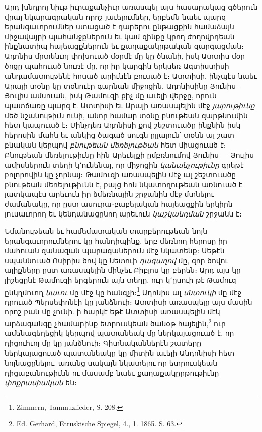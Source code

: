 \documentclass{article}
\begin{document}
{Արդ խնդրոյ նիւթ իւրաքանչիւր առասպել այս հասարակաց գծերուն վրայ նկարագրական որոշ յաւելումներ, երբեմն նաեւ պարզ երանգաւորումներ ստացած է դարերու ընթացքին համաձայն միջավայրի պահանջքներուն եւ կամ զինքը կրող ժողովրդեան ինքնատիպ հայեացքներուն եւ քաղաքակրթական զարգացման։ Ադոնիս մրտենւոյ փոխուած մօրմէ մը կը ծնանի, իսկ Ատտիս մօր ծոցը պահուած նուռէ մը, որ իր կարգին երկսեռ Ագտիստիսի անդամատութենէ հոսած արիւնէն բուսած է։ Ատտիսի, ինչպէս նաեւ Արայի տօնը կը տօնուէր գարնան միջոցին, Ադոնիսինը Յունիս — Յուլիս ամսուան, իսկ Թամուզի քիչ մը աւելի վերջը, որուն պատճառը պարզ է. Ատտիսի եւ Արայի առասպելին մէջ \emph{յարութիւնը} մեծ նշանութիւն ունի, անոր համար տօնը բնութեան զարթնումին հետ կապուած է։ Մինչդեռ Ադոնիսի քով շեշտուածը ինքնին իսկ հերոսին մահն եւ անկից ծագած սուգն ըլլալուն՝ տօնն ալ շատ բնական կերպով \emph{բնութեան մեռելութեան} հետ միացուած է։ Բնութեան մեռելութիւնը հին Արեւելքի ըմբռնումով Յունիս — Յուլիս ամիսներուն տեղի կ՚ունենայ, որ միջոցին \emph{կանանչութիւնը} գրեթէ բոլորովին կը չորնայ։ Թամուզի առասպելին մէջ ալ շեշտուածը բնութեան մեռելութիւնն է, բայց հոն նկատողութեան առնուած է յատկապէս արեւուն իր ձմեռնային շրջանին մէջ մտնելու ժամանակը, որ ըստ ասուրա֊բաբելական հայեացքին երկիրն լուսաւորող եւ կենդանացընող արեւուն \emph{կաշկանդման} շրջանն է։

Նմանութեան եւ համեմատական տարբերութեան նոյն երանգաւորումներու կը հանդիպինք, երբ մեռնող հերոսը իր մահուան զանազան պարագաներուն մէջ նկատենք։ Սեթէն սպաննուած Ոսիրիս ծով կը նետուի \emph{դագաղով} մը, զոր ծովու ալիքները ըստ առասպելին մինչեւ Բիբլոս կը բերեն։ Արդ այս կը յիշեցընէ Թամուզի երգերուն այն տեղը, ուր կ՚ըսուի թէ Թամուզ ընկղմուող \emph{նաւու} մը մէջ կը հանգչի։\footnote{Zimmern, Tammuzlieder, S. 208.} Ադոնիս ալ \emph{սնտուկի} մը մէջ դրուած Պերսեփոնէի կը յանձնուի։ Ատտիսի առասպելը այս մասին որոշ բան մը չունի. ի հարկէ եթէ Ատտիսի առասպելին մէկ արձագանգը չհամարինք ետրուսկեան ծանօթ հայելին,\footnote{Ed. Gerhard, Etruskische Spiegel, 4., 1. 1865. S. 63.} ուր ամենագեղեցիկ կերպով պատանեակ մը ներկայացուած է, որ դիցուհւոյ մը կը յանձնուի։ Գիտնականներէն շատերը ներկայացուած պատանեակը կը միտին աւելի Անդոնիսի հետ նոյնացընելու, առանց սակայն նկատելու որ ետրուսկեան դիցաբանութիւնն ու մասամբ նաեւ քաղաքակըրթութիւնը \emph{փոքրասիական} են։

}
\end{document}
